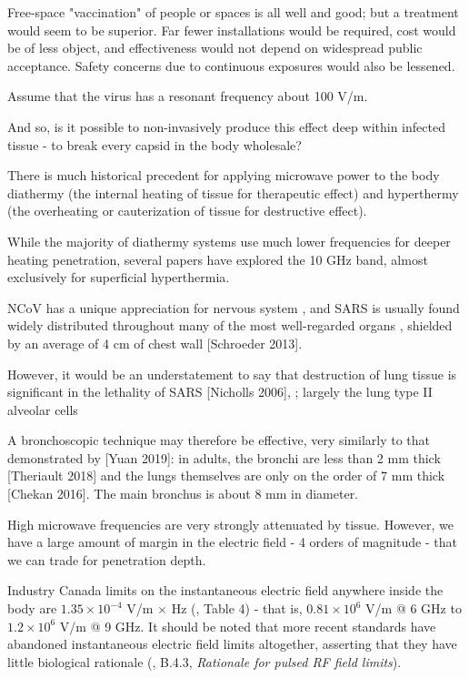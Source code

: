 \documentclass[paper.tex]{subfiles}
\begin{document}
Free-space "vaccination" of people or spaces is all well and good; but a treatment would seem to be superior. Far fewer installations would be required, cost would be of less object, and effectiveness would not depend on widespread public acceptance. Safety concerns due to continuous exposures would also be lessened.

Assume that the virus has a resonant frequency about 100 V/m. 

And so, is it possible to non-invasively produce this effect deep within infected tissue - to break every capsid in the body wholesale?

There is much historical precedent for applying microwave power to the body diathermy (the internal heating of tissue for therapeutic effect) and hyperthermy (the overheating or cauterization of tissue for destructive effect). 

While the majority of diathermy systems use much lower frequencies for deeper heating penetration, several papers have explored the 10 GHz band, almost exclusively for superficial hyperthermia.

NCoV has a unique appreciation for nervous system \cite{neuroinvasive2020}, and SARS is usually found widely distributed throughout many of the most well-regarded organs \cite{Organ2004}, shielded by an average of 4 cm of chest wall [Schroeder 2013]. 

However, it would be an understatement to say that destruction of lung tissue is significant in the lethality of SARS [Nicholls 2006], \cite{situ2020}; largely the lung type II alveolar cells 



A bronchoscopic technique may therefore be effective, very similarly to that demonstrated by [Yuan 2019]: in adults, the bronchi are less than 2 mm thick [Theriault 2018] and the lungs themselves are only on the order of 7 mm thick [Chekan 2016]. The main bronchus is about 8 mm in diameter.

High microwave frequencies are very strongly attenuated by tissue. However, we have a large amount of margin in the electric field - 4 orders of magnitude - that we can trade for penetration depth.

Industry Canada limits on the instantaneous electric field anywhere inside the body are $1.35 \times 10^{-4}$ V/m $\times$ Hz (\cite{RSS1022015}, Table 4) - that is, $0.81 \times 10^6$ V/m @ 6 GHz to $1.2 \times 10^6$ V/m @ 9 GHz. It should be noted that more recent standards have abandoned instantaneous electric field limits altogether, asserting that they have little biological rationale (\cite{C95}, B.4.3, {\it Rationale for pulsed RF field limits}).\footnotemark
\end{document}
